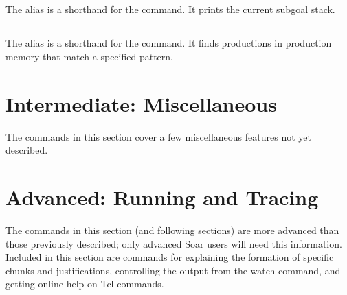{%
\subsection{}
\label{ps}

The  alias is a shorthand for the  command. It
prints the current subgoal stack.

\subsection{}
\label{pf}

The  alias is a shorthand for the  command. It
finds productions in production memory that match a specified pattern.


\section{Intermediate: Miscellaneous}

The commands in this section cover a few miscellaneous features not yet
described. 

\section{Advanced: Running and Tracing}

The commands in this section (and following sections) are more advanced than
those previously described; only advanced Soar users will need this
information. Included in this section are commands for explaining the
formation of specific chunks and justifications, controlling the output
from the watch command, and getting online help on Tcl commands.

}
